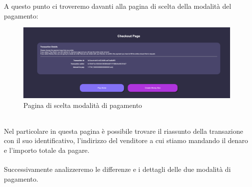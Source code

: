         A questo punto ci troveremo davanti alla pagina di scelta della modalità del pagamento:
        \begin{figure}[H]
            \centering
            \includegraphics[scale=0.2]{immagini/Checkout/PaymentMode.png}
            \caption{Pagina di scelta modalità di pagamento}
        \end{figure}
        \textbf{}\\
        Nel particolare in questa pagina è possibile trovare il riassunto della transazione con  il suo identificativo, l'indirizzo del venditore a cui stiamo mandando il denaro e l'importo totale da pagare.\\\\
        Successivamente analizzeremo le differenze e i dettagli delle due modalità di pagamento.
